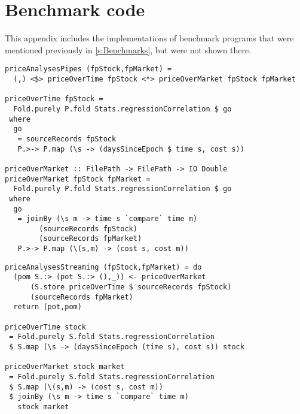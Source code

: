 \chapter{Benchmark code}
\label{app:Benchmarks}

This appendix includes the implementations of benchmark programs that were mentioned previously in \cref{s:Benchmarks}, but were not shown there.

% 
% 

\begin{lstlisting}[float=ht,label=l:a:bench:priceAnalysesPipes,caption=Pipes two-pass implementation of \Hs/priceAnalyses/]
priceAnalysesPipes (fpStock,fpMarket) =
  (,) <$> priceOverTime fpStock <*> priceOverMarket fpStock fpMarket

priceOverTime fpStock = 
  Fold.purely P.fold Stats.regressionCorrelation $ go
 where
  go
   = sourceRecords fpStock
   P.>-> P.map (\s -> (daysSinceEpoch $ time s, cost s)) 

priceOverMarket :: FilePath -> FilePath -> IO Double
priceOverMarket fpStock fpMarket = 
  Fold.purely P.fold Stats.regressionCorrelation $ go
 where
  go
   = joinBy (\s m -> time s `compare` time m)
        (sourceRecords fpStock)
        (sourceRecords fpMarket)
   P.>-> P.map (\(s,m) -> (cost s, cost m)) 
\end{lstlisting}

\begin{lstlisting}[float=ht,label=l:a:bench:priceAnalysesStreaming,caption=Streaming implementation of \Hs/priceAnalyses/]
priceAnalysesStreaming (fpStock,fpMarket) = do
  (pom S.:> (pot S.:> (),_)) <- priceOverMarket
      (S.store priceOverTime $ sourceRecords fpStock)
      (sourceRecords fpMarket)
  return (pot,pom)

priceOverTime stock
 = Fold.purely S.fold Stats.regressionCorrelation
 $ S.map (\s -> (daysSinceEpoch (time s), cost s)) stock

priceOverMarket stock market
 = Fold.purely S.fold Stats.regressionCorrelation
 $ S.map (\(s,m) -> (cost s, cost m))
 $ joinBy (\s m -> time s `compare` time m)
   stock market
\end{lstlisting}

